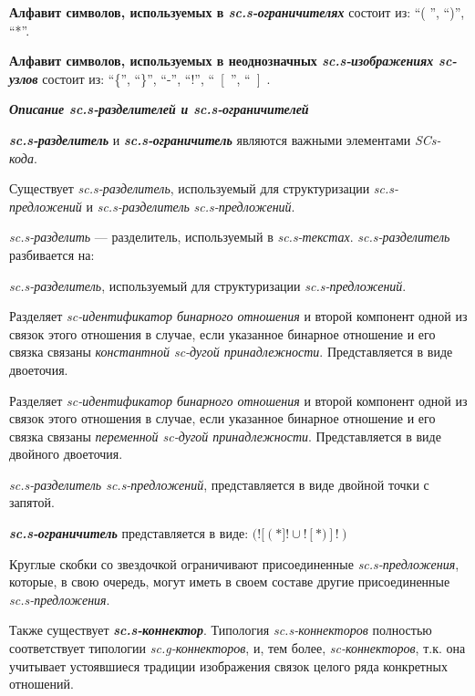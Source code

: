 \textbf{Алфавит символов, используемых в \textit{sc.s-ограничителях}\scnsupergroupsign} состоит из: ``( ''{}, ``)''{}, ``*''{}.

\textbf{Алфавит символов, используемых в неоднозначных \textit{sc.s-изображениях sc-узлов}\scnsupergroupsign} состоит из:
``\{''{}, ``\}''{}, 
``-''{}, ``!''{}, ``~[ \,''{}, ``~] \,{}.

\bigskip
\textbf{\textit{Описание sc.s-разделителей и sc.s-ограничителей}}

\textbf{\textit{sc.s-разделитель}} и \textbf{\textit{sc.s-ограничитель}} являются важными элементами \textit{SCs-кода}.

Существует \textit{sc.s-разделитель}, используемый для структуризации \textit{sc.s-предложений} и \textit{sc.s-разделитель} \textit{sc.s-предложений}.

\textit{sc.s-разделить} --- разделитель, используемый в \textit{sc.s-текстах}. \textit{sc.s-разделитель} разбивается на:
\begin{textitemize}
	\item \textit{sc.s-разделитель}, используемый для структуризации \textit{\textit{sc.s-предложений}}.
	\begin{textitemize}
		\item Разделяет \textit{sc-идентификатор бинарного отношения} и второй компонент одной из связок этого отношения в случае, если указанное бинарное отношение и его связка связаны \textit{константной sc-дугой принадлежности}. Представляется в виде двоеточия.
		\item Разделяет \textit{sc-идентификатор бинарного отношения} и второй компонент одной из связок этого отношения в случае, если указанное бинарное отношение и его связка связаны \textit{переменной sc-дугой принадлежности}. Представляется в виде двойного двоеточия.
	\end{textitemize}
	\item \textit{sc.s-разделитель \textit{sc.s-предложений}}, представляется в виде двойной точки с запятой.    
\end{textitemize}

\bigskip
\textbf{\textit{sc.s-ограничитель}} представляется в виде: $(![  (\ast ]! \cup ![  \ast) ]!)$

Круглые скобки со звездочкой ограничивают присоединенные \textit{sc.s-предложения}, которые, в свою очередь, могут иметь в своем составе другие присоединенные \textit{sc.s-предложения}.

Также существует \textbf{\textit{sc.s-коннектор}}. Типология \textit{sc.s-коннекторов} полностью соответствует типологии \textit{sc.g-коннекторов}, и, тем более, \textit{sc-коннекторов}, т.к. она учитывает устоявшиеся традиции изображения связок целого ряда конкретных отношений.

